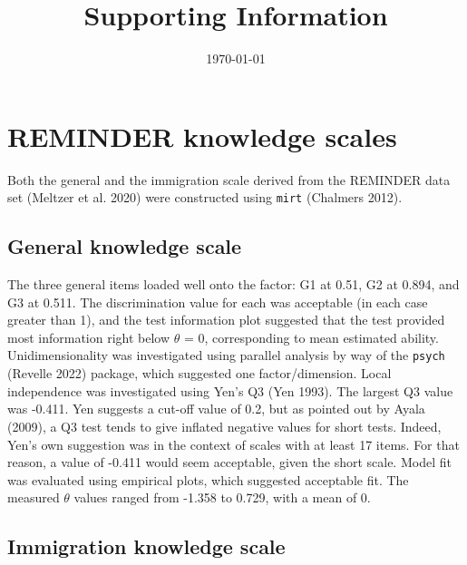 \documentclass[11pt,halfline,a4paper,]{ouparticle}
\begin{document}
\title{Supporting Information}

\author{%
%
%
%
%
%
}

\abstract{}

\date{\today}

\keywords{}

\maketitle



\hypertarget{reminder-knowledge-scales}{%
\section{REMINDER knowledge scales}\label{reminder-knowledge-scales}}

Both the general and the immigration scale derived from the REMINDER
data set (Meltzer et al. 2020) were constructed using \texttt{mirt}
(Chalmers 2012).

\hypertarget{general-knowledge-scale}{%
\subsection{General knowledge scale}\label{general-knowledge-scale}}

The three general items loaded well onto the factor: G1 at 0.51, G2 at
0.894, and G3 at 0.511. The discrimination value for each was acceptable
(in each case greater than 1), and the test information plot suggested
that the test provided most information right below \(\theta\) = 0,
corresponding to mean estimated ability. Unidimensionality was
investigated using parallel analysis by way of the \texttt{psych}
(Revelle 2022) package, which suggested one factor/dimension. Local
independence was investigated using Yen's Q3 (Yen 1993). The largest Q3
value was -0.411. Yen suggests a cut-off value of 0.2, but as pointed
out by Ayala (2009), a Q3 test tends to give inflated negative values
for short tests. Indeed, Yen's own suggestion was in the context of
scales with at least 17 items. For that reason, a value of -0.411 would
seem acceptable, given the short scale. Model fit was evaluated using
empirical plots, which suggested acceptable fit. The measured \(\theta\)
values ranged from -1.358 to 0.729, with a mean of 0.

\hypertarget{immigration-knowledge-scale}{%
\subsection{Immigration knowledge
scale}\label{immigration-knowledge-scale}}
\end{document}
